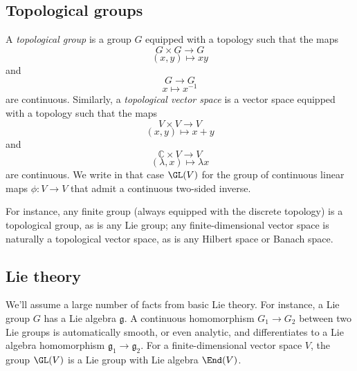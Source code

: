 \documentclass[reqno]{amsart} 
\begin{document}
\subsection{Topological groups}
\begin{definition}
  A \emph{topological group} is a group $G$ equipped with a topology such that the maps
  \begin{equation*}
    G \times G \rightarrow G
  \end{equation*}
  \begin{equation*}
    (x,y) \mapsto x y
  \end{equation*}
  and
  \begin{equation*}
    G \rightarrow G
  \end{equation*}
  \begin{equation*}
    x \mapsto x^{-1}
  \end{equation*}
  are continuous.  Similarly, a \emph{topological vector space} is a vector space equipped with a topology such that the maps
  \begin{equation*}
    V \times V \rightarrow V
  \end{equation*}
  \begin{equation*}
    (x,y) \mapsto x + y
  \end{equation*}
  and
  \begin{equation*}
    \mathbb{C} \times V \rightarrow V
  \end{equation*}
  \begin{equation*}
    (\lambda,x) \mapsto \lambda x
  \end{equation*}
  are continuous.  We write in that case $\GL(V)$ for the group of continuous linear maps $\phi : V \rightarrow V$ that admit a continuous two-sided inverse.
\end{definition}
For instance, any finite group (always equipped with the discrete topology) is a topological group, as is any Lie group; any finite-dimensional vector space is naturally a topological vector space, as is any Hilbert space or Banach space.

\subsection{Lie theory}
We'll assume a large number of facts from basic Lie theory.  For instance, a Lie group $G$ has a Lie algebra $\mathfrak{g}$.  A continuous homomorphism $G_1 \rightarrow G_2$ between two Lie groups is automatically smooth, or even analytic, and differentiates to a Lie algebra homomorphism $\mathfrak{g}_1 \rightarrow \mathfrak{g}_2$.  For a finite-dimensional vector space $V$, the group $\GL(V)$ is a Lie group with Lie algebra $\End(V)$.
\end{document}
